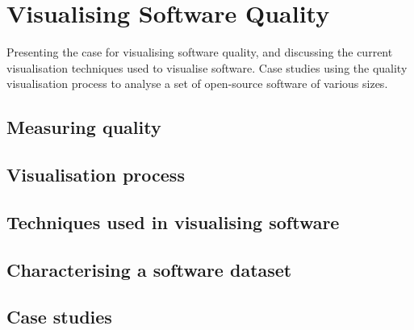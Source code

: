 \chapter{Visualising Software Quality}
\ifpdf
    \graphicspath{{Chapter3/Chapter3Figs/PNG/}{Chapter3/Chapter3Figs/PDF/}{Chapter3/Chapter3Figs/}}
\else
    \graphicspath{{Chapter3/Chapter3Figs/EPS/}{Chapter3/Chapter3Figs/}}
\fi

Presenting the case for visualising software quality, and discussing the current visualisation techniques used to visualise software.  Case studies using the quality visualisation process to analyse a set of open-source software of various sizes.

\section{Measuring quality}


\section{Visualisation process}


\section{Techniques used in visualising software}


\section{Characterising a software dataset}


\section{Case studies}




